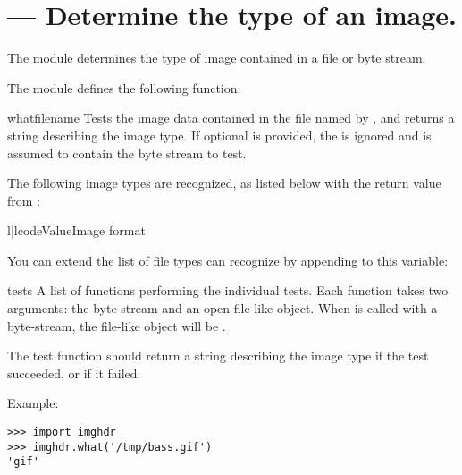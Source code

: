\section{ ---
         Determine the type of an image.}



The  module determines the type of image contained in a
file or byte stream.

The  module defines the following function:


\begin{funcdesc}{what}{filename}
Tests the image data contained in the file named by ,
and returns a string describing the image type.  If optional 
is provided, the  is ignored and  is assumed to
contain the byte stream to test.
\end{funcdesc}

The following image types are recognized, as listed below with the
return value from :

\begin{tableii}{l|l}{code}{Value}{Image format}
\end{tableii}

You can extend the list of file types  can recognize by
appending to this variable:

\begin{datadesc}{tests}
A list of functions performing the individual tests.  Each function
takes two arguments: the byte-stream and an open file-like object.
When  is called with a byte-stream, the file-like
object will be .

The test function should return a string describing the image type if
the test succeeded, or  if it failed.
\end{datadesc}

Example:

\begin{verbatim}
>>> import imghdr
>>> imghdr.what('/tmp/bass.gif')
'gif'
\end{verbatim}
